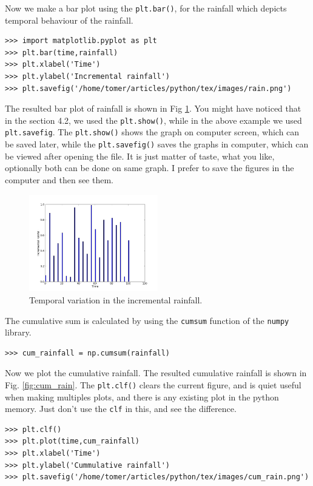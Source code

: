 \documentclass[10pt]{book}
\begin{document}
{Now we make a bar plot using the \verb"plt.bar()", for the rainfall which depicts temporal behaviour of the rainfall. 
\beforeverb \begin{verbatim}
>>> import matplotlib.pyplot as plt
>>> plt.bar(time,rainfall)
>>> plt.xlabel('Time')
>>> plt.ylabel('Incremental rainfall')
>>> plt.savefig('/home/tomer/articles/python/tex/images/rain.png')
\end{verbatim} \afterverb
The resulted bar plot of rainfall is shown in Fig \ref{fig:rain}. You might have noticed that in the section 4.2, we used the \verb"plt.show()", while in the above example we used \verb"plt.savefig". The \verb"plt.show()" shows the graph on computer screen, which can be saved later, while the \verb"plt.savefig()" saves the graphs in computer, which can be viewed after opening the file. It is just matter of taste, what you like, optionally both can be done on same graph. I prefer to save the figures in the computer and then see them. 

\beforefig
\begin{figure}[h!]
  \centering
    \includegraphics[width=0.5\textwidth]{images/rain.png}
  \caption{Temporal variation in the incremental rainfall. }
  \label{fig:rain}
\end{figure}
\afterfig

The cumulative sum is calculated by using the \verb"cumsum" function of the \verb"numpy" library. 
\beforeverb \begin{verbatim}
>>> cum_rainfall = np.cumsum(rainfall)
\end{verbatim} \afterverb
{}

Now we plot the cumulative rainfall. The resulted cumulative rainfall is shown in Fig. \ref{fig:cum_rain}. The \verb"plt.clf()" clears the current figure, and is quiet useful when making multiples plots, and there is any existing plot in the python memory. Just don't use the \verb"clf" in this, and see the difference. 
\beforeverb \begin{verbatim}
>>> plt.clf()
>>> plt.plot(time,cum_rainfall)
>>> plt.xlabel('Time')
>>> plt.ylabel('Cummulative rainfall')
>>> plt.savefig('/home/tomer/articles/python/tex/images/cum_rain.png')
\end{verbatim} \afterverb

}
\end{document}
